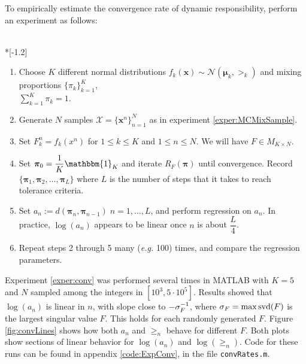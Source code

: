 To empirically estimate the convergence rate of dynamic responsibility, perform an experiment as follows:
\begin{experiment}\label{exper:conv}
	\ \\*[-1.2\baselineskip]
	\begin{enumerate}
		\item Choose \( K \) different normal distributions \( f_k(\bm x) \sim \mathcal{N}(\bm\mu_k,\bm\gt_k) \)
		and mixing proportions \( \{\pi_k\}_{k=1}^{K}\), \\\( \sum_{k=1}^{K}\pi_k =1 \).
		\item Generate \( N \) samples $\mathcal{X}=\{\bm x^n\}_{n=1}^{N}$ as in experiment \ref{exper:MCMixSample}.
		\item Set \( F_{k}^{n} = f_k(x^n) \) for \( 1\leq k\leq K \) and \( 1\leq n\leq N \). We will have \( F\in M_{K\times N} \).
		\item Set \( \bm\pi_0 = \dfrac{1}{K}\mathbbm{1}_K \) and iterate \( R_F(\bm\pi) \) until convergence.  Record \( \{\bm\pi_1,\bm\pi_2,\ldots, \bm\pi_L\} \) where \( L \) is the number of steps that it takes to reach tolerance criteria.
		\item Set \( a_{n} := d(\bm\pi_n, \bm\pi_{n-1})\; n=1,\ldots,L \), and perform regression on \( a_n \).  In practice, \( \log(a_n) \) appears to be linear once \( n \) is about \( \dfrac{L}{4} \).
		\item Repeat steps 2 through 5 many (\textit{e.g.} 100) times, and compare the regression parameters.
		
	\end{enumerate}
\end{experiment}

Experiment \ref{exper:conv} was performed several times in MATLAB with \( K=5 \) and \( N \) sampled among the integers in \( [10^3,5\cdot10^5] \).  Results showed that \( \log(a_n) \) is linear in \( n \), with slope close to \( -\sigma_F^{-1} \), where \( \sigma_F = \max \operatorname{svd}(F) \) is the largest singular value \( F \). This holds for each randomly generated \( F \).  Figure \ref{fig:convLines} shows how both \( a_n \) and \( \ge_n \) behave for different \( F. \)  Both plots show sections of linear behavior for \( \log(a_n) \) and \( \log(\ge_n) \). Code for these runs can be found in appendix \ref{code:ExpConv}, in the file \verb|convRates.m|.

